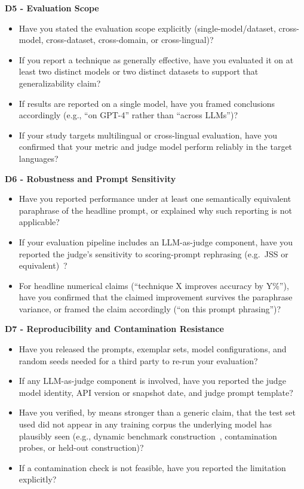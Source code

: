 \documentclass[acmsmall, nonacm, screen]{acmart}
\begin{document}
\textbf{D5 - Evaluation Scope}
\begin{itemize}
  \item Have you stated the evaluation scope explicitly
        (single-model/dataset, cross-model, cross-dataset, cross-domain,
        or cross-lingual)?
  \item If you report a technique as generally effective, have you
        evaluated it on at least two distinct models or two distinct
        datasets to support that generalizability claim?
  \item If results are reported on a single model, have you framed
        conclusions accordingly (e.g., ``on GPT-4'' rather than ``across
        LLMs'')?
  \item If your study targets multilingual or cross-lingual evaluation,
        have you confirmed that your metric and judge model perform
        reliably in the target languages?
\end{itemize}

\textbf{D6 - Robustness and Prompt Sensitivity}
\begin{itemize}
  \item Have you reported performance under at least one
        semantically equivalent paraphrase of the headline prompt,
        or explained why such reporting is not applicable?
  \item If your evaluation pipeline includes an LLM-as-judge
        component, have you reported the judge's sensitivity to
        scoring-prompt rephrasing (e.g.\ JSS or
        equivalent)~\cite{bellibatlu2026judgesense}?
  \item For headline numerical claims (``technique X improves
        accuracy by Y\%''), have you confirmed that the claimed
        improvement survives the paraphrase variance, or framed the
        claim accordingly (``on this prompt phrasing'')?
\end{itemize}

\textbf{D7 - Reproducibility and Contamination Resistance}
\begin{itemize}
  \item Have you released the prompts, exemplar sets, model
        configurations, and random seeds needed for a third party to
        re-run your evaluation?
  \item If any LLM-as-judge component is involved, have you
        reported the judge model identity, API version or snapshot
        date, and judge prompt template?
  \item Have you verified, by means stronger than a generic claim,
        that the test set used did not appear in any training corpus
        the underlying model has plausibly seen (e.g., dynamic
        benchmark construction~\cite{wildbench2024}, contamination
        probes, or held-out construction)?
  \item If a contamination check is not feasible, have you reported
        the limitation explicitly?
\end{itemize}
\end{document}
